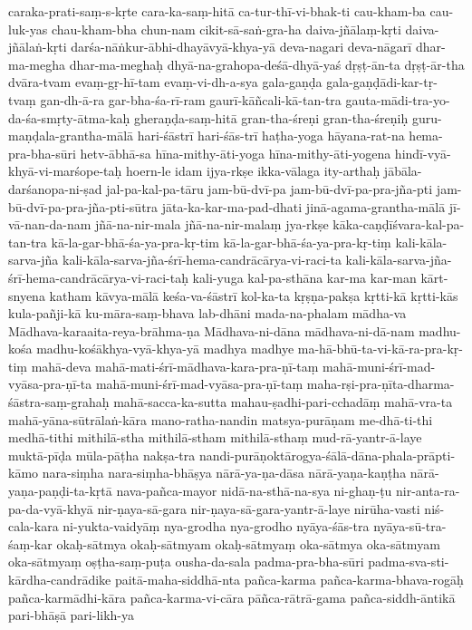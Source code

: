 {{caraka-prati-saṃ-s-kṛte
cara-ka-saṃ-hitā
ca-tur-thī-vi-bhak-ti
cau-kham-ba
cau-luk-yas
chau-kham-bha
chun-nam
cikit-sā-saṅ-gra-ha
daiva-jñālaṃ-kṛti
daiva-jñālaṅ-kṛti
darśa-nāṅkur-ābhi-dhayāvyā-khya-yā
deva-nagari
deva-nāgarī
dhar-ma-megha
dhar-ma-meghaḥ
dhyā-na-grahopa-deśā-dhyā-yaś
dṛṣṭ-ān-ta
dṛṣṭ-ār-tha
dvāra-tvam
evaṃ-gṛ-hī-tam
evaṃ-vi-dh-a-sya
gala-gaṇḍa
gala-gaṇḍādi-kar-tṛ-tvaṃ
gan-dh-ā-ra
gar-bha-śa-rī-ram
gaurī-kāñcali-kā-tan-tra
gauta-mādi-tra-yo-da-śa-smṛty-ātma-kaḥ
gheraṇḍa-saṃ-hitā
gran-tha-śreṇi
gran-tha-śreṇiḥ
guru-maṇḍala-grantha-mālā
hari-śāstrī
hari-śās-trī
haṭha-yoga
hāyana-rat-na
hema-pra-bha-sūri
hetv-ābhā-sa
hīna-mithy-āti-yoga
hīna-mithy-āti-yogena
hindī-vyā-khyā-vi-marśope-taḥ
hoern-le
idam
ijya-rkṣe
ikka-vālaga
ity-arthaḥ
jābāla-darśanopa-ni-ṣad
jal-pa-kal-pa-tāru
jam-bū-dvī-pa
jam-bū-dvī-pa-pra-jña-pti
jam-bū-dvī-pa-pra-jña-pti-sūtra
jāta-ka-kar-ma-pad-dhati
jinā-agama-grantha-mālā
jī-vā-nan-da-nam
jñā-na-nir-mala
jñā-na-nir-malaṃ
jya-rkṣe
kāka-caṇḍīśvara-kal-pa-tan-tra
kā-la-gar-bhā-śa-ya-pra-kṛ-tim
kā-la-gar-bhā-śa-ya-pra-kṛ-tiṃ
kali-kāla-sarva-jña
kali-kāla-sarva-jña-śrī-hema-candrācārya-vi-raci-ta
kali-kāla-sarva-jña-śrī-hema-candrācārya-vi-raci-taḥ
kali-yuga
kal-pa-sthāna
kar-ma
kar-man
kārt-snyena
katham
kāvya-mālā
keśa-va-śāstrī
kol-ka-ta
kṛṣṇa-pakṣa
kṛtti-kā
kṛtti-kās
kula-pañji-kā
ku-māra-saṃ-bhava
lab-dhāni
mada-na-phalam
mādha-va
Mādhava-karaaita-reya-brāhma-ṇa
Mādhava-ni-dāna
mādhava-ni-dā-nam
madhu-kośa
madhu-kośākhya-vyā-khya-yā
madhya
madhye
ma-hā-bhū-ta-vi-kā-ra-pra-kṛ-tiṃ
mahā-deva
mahā-mati-śrī-mādhava-kara-pra-ṇī-taṃ
mahā-muni-śrī-mad-vyāsa-pra-ṇī-ta
mahā-muni-śrī-mad-vyāsa-pra-ṇī-taṃ
maha-rṣi-pra-ṇīta-dharma-śāstra-saṃ-grahaḥ
mahā-sacca-ka-sutta
mahau-ṣadhi-pari-cchadāṃ
mahā-vra-ta
mahā-yāna-sūtrālaṅ-kāra
mano-ratha-nandin
matsya-purāṇam
me-dhā-ti-thi
medhā-tithi
mithilā-stha
mithilā-stham
mithilā-sthaṃ
mud-rā-yantr-ā-laye
muktā-pīḍa
mūla-pāṭha
nakṣa-tra
nandi-purāṇoktārogya-śālā-dāna-phala-prāpti-kāmo
nara-siṃha
nara-siṃha-bhāṣya
nārā-ya-ṇa-dāsa
nārā-yaṇa-kaṇṭha
nārā-yaṇa-paṇḍi-ta-kṛtā
nava-pañca-mayor
nidā-na-sthā-na-sya
ni-ghaṇ-ṭu
nir-anta-ra-pa-da-vyā-khyā
nir-ṇaya-sā-gara
nir-ṇaya-sā-gara-yantr-ā-laye
nirūha-vasti
niś-cala-kara
ni-yukta-vaidyāṃ
nya-grodha
nya-grodho
nyāya-śās-tra
nyāya-sū-tra-śaṃ-kar
okaḥ-sātmya
okaḥ-sātmyam
okaḥ-sātmyaṃ
oka-sātmya
oka-sātmyam
oka-sātmyaṃ
oṣṭha-saṃ-puṭa
ousha-da-sala
padma-pra-bha-sūri
padma-sva-sti-kārdha-candrādike
paitā-maha-siddhā-nta
pañca-karma
pañca-karma-bhava-rogāḥ
pañca-karmādhi-kāra
pañca-karma-vi-cāra
pāñca-rātrā-gama
pañca-siddh-āntikā
pari-bhāṣā
pari-likh-ya
}}
